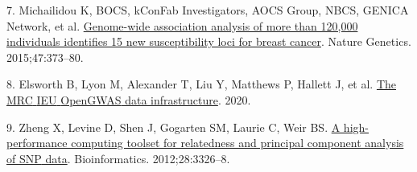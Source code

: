 \documentclass[
]{book}
\newlength{\cslhangindent}
\newlength{\cslentryspacingunit} %
\newenvironment{CSLReferences}[2] %
 {%
  \setlength{\parindent}{0pt}
  \ifodd #1
  \let\oldpar\par
  \def\par{\hangindent=\cslhangindent\oldpar}
  \fi
  \setlength{\parskip}{#2\cslentryspacingunit}
 }%
 {}
\begin{document}
\begin{CSLReferences}{0}{0}
\leavevmode{}%
7. Michailidou K, BOCS, kConFab Investigators, AOCS Group, NBCS, GENICA Network, et al. \href{https://doi.org/10.1038/ng.3242}{Genome-wide association analysis of more than 120,000 individuals identifies 15 new susceptibility loci for breast cancer}. Nature Genetics. 2015;47:373--80.

\leavevmode{}%
8. Elsworth B, Lyon M, Alexander T, Liu Y, Matthews P, Hallett J, et al. \href{https://doi.org/10.1101/2020.08.10.244293}{The {MRC} {IEU} {OpenGWAS} data infrastructure}. 2020.

\leavevmode{}%
9. Zheng X, Levine D, Shen J, Gogarten SM, Laurie C, Weir BS. \href{https://doi.org/10.1093/bioinformatics/bts606}{A high-performance computing toolset for relatedness and principal component analysis of {SNP} data}. Bioinformatics. 2012;28:3326--8.

\end{CSLReferences}
\end{document}
